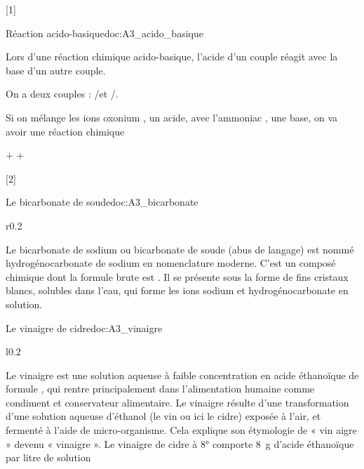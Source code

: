 [1]

\begin{doc}{Réaction acido-basique}{doc:A3_acido_basique}
  \begin{importants}  
    Lors d'une réaction chimique acido-basique, l'acide d'un couple réagit avec la base d'un autre couple.
  \end{importants}
  
  \exemple On a deux couples : \oxonium/\eau et /\ammoniac.

  Si on mélange les ions oxonium , un acide, avec l'ammoniac \ammoniac, une base, on va avoir une réaction chimique
  \vspace*{-12pt}
  \begin{center}
    \oxonium + \ammoniac \reaction \eau + 
  \end{center}
\end{doc}

[2]

\newpage
\vspace*{-40pt}

\begin{doc}{Le bicarbonate de soude}{doc:A3_bicarbonate}
  \begin{wrapfigure}{r}{0.2\linewidth}
    \vspace*{-38pt}
    \centering
  \end{wrapfigure}
  Le bicarbonate de sodium ou bicarbonate de soude (abus de langage) est nommé hydrogénocarbonate de sodium en nomenclature moderne.
  C’est un composé chimique dont la formule brute est \bicarbonateDeSodium.
  Il se présente sous la forme de fins cristaux blancs, solubles dans l’eau, qui forme les ions sodium \ionSodium et hydrogénocarbonate \bicarbonate en solution.
\end{doc}

\begin{doc}{Le vinaigre de cidre}{doc:A3_vinaigre}
  \begin{wrapfigure}{l}{0.2\linewidth}
    \vspace*{-22pt}
    \centering
  \end{wrapfigure}
  Le vinaigre est une solution aqueuse à faible concentration en acide éthanoïque de
  formule , qui rentre principalement dans l'alimentation humaine comme condiment et conservateur alimentaire. 
  Le vinaigre résulte d'une transformation d'une solution aqueuse d'éthanol (le vin ou ici le cidre) exposée à l'air, et fermenté à l’aide de micro-organisme.
  Cela explique son étymologie de « vin aigre » devenu « vinaigre ».
  Le vinaigre de cidre à 8° comporte \qty{8}{\g} d’acide éthanoïque par litre de solution
\end{doc}

